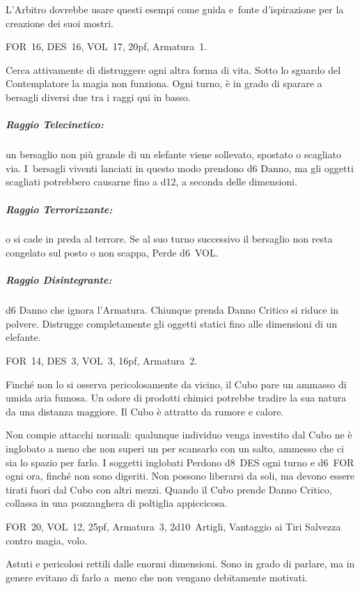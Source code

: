 \documentclass[itdr]{subfiles}
\begin{document}
\label{ch:appendice_b}

L'Arbitro dovrebbe usare questi esempi come guida e~fonte d'ispirazione per la creazione dei suoi mostri.

\vfill

FOR~16, DES~16, VOL~17, 20pf, Armatura~1.

Cerca attivamente di distruggere ogni altra forma di vita. Sotto lo sguardo del Contemplatore la magia non funziona. Ogni turno, è in grado di sparare a bersagli diversi due tra i raggi qui in basso.

\subparagraph{Raggio Telecinetico:} un bersaglio non più grande di un elefante viene sollevato, spostato o scagliato via. I~bersagli viventi lanciati in questo modo prendono d6 Danno, ma gli oggetti scagliati potrebbero causarne fino a d12, a seconda delle dimensioni.

\subparagraph{Raggio Terrorizzante:}  o si cade in preda al terrore. Se al suo turno successivo il bersaglio non resta congelato sul posto o non scappa, Perde d6~VOL.

\subparagraph{Raggio Disintegrante:} d6 Danno che ignora l'\mbox{Armatura}. Chiunque prenda Danno Critico si riduce in polvere. Distrugge completamente gli oggetti statici fino alle dimensioni di un elefante.

\vfill

FOR~14, DES~3, VOL~3, 16pf, Armatura~2.

Finché non lo si osserva pericolosamente da vicino, il Cubo pare un ammasso di umida aria fumosa. Un odore di prodotti chimici potrebbe tradire la sua natura da una distanza maggiore. Il Cubo è attratto da rumore e calore.

Non compie attacchi normali: qualunque individuo venga investito dal Cubo ne è inglobato a meno che non superi un  per scansarlo con un salto, ammesso che ci sia lo spazio per farlo. I soggetti inglobati Perdono d8~DES ogni turno e d6~FOR ogni ora, finché non sono digeriti. Non possono liberarsi da soli, ma devono essere tirati fuori dal Cubo con altri mezzi. Quando il Cubo prende Danno Critico, collassa in una pozzanghera di poltiglia appiccicosa.

\vfill

FOR~20, VOL~12, 25pf, Armatura~3, 2d10~Artigli, \mbox{Vantaggio} ai Tiri Salvezza contro magia, volo.

Astuti e pericolosi rettili dalle enormi dimensioni. Sono in grado di parlare, ma in genere evitano di farlo a~meno che non vengano debitamente motivati.
\end{document}
